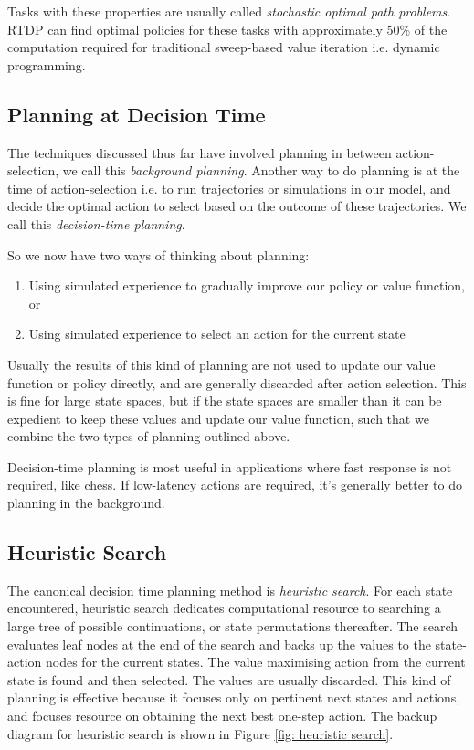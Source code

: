 Tasks with these properties are usually called \textit{stochastic optimal path problems}. RTDP can find optimal policies for these tasks with approximately 50\% of the computation required for traditional sweep-based value iteration i.e. dynamic programming.

\subsection{Planning at Decision Time}
The techniques discussed thus far have involved planning in between action-selection, we call this \textit{background planning}. Another way to do planning is at the time of action-selection i.e. to run trajectories or simulations in our model, and decide the optimal action to select based on the outcome of these trajectories. We call this \textit{decision-time planning}.

So we now have two ways of thinking about planning:
\begin{enumerate}
	\item Using simulated experience to gradually improve our policy or value function, or
	\item Using simulated experience to select an action for the current state
\end{enumerate}

Usually the results of this kind of planning are not used to update our value function or policy directly, and are generally discarded after action selection. This is fine for large state spaces, but if the state spaces are smaller than it can be expedient to keep these values and update our value function, such that we combine the two types of planning outlined above.

Decision-time planning is most useful in applications where fast response is not required, like chess. If low-latency actions are required, it's generally better to do planning in the background.

\subsection{Heuristic Search}
The canonical decision time planning method is \textit{heuristic search}. For each state encountered, heuristic search dedicates computational resource to searching a large tree of possible continuations, or state permutations thereafter. The search evaluates leaf nodes at the end of the search and backs up the values to the state-action nodes for the current states. The value maximising action from the current state is found and then selected. The values are usually discarded. This kind of planning is effective because it focuses only on pertinent next states and actions, and focuses resource on obtaining the next best one-step action. The backup diagram for heuristic search is shown in Figure \ref{fig: heuristic search}.

